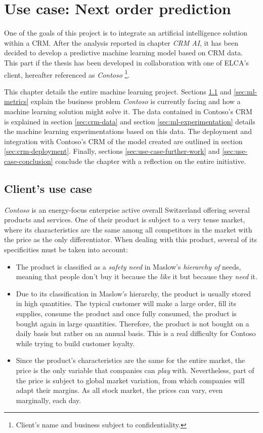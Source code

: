\chapter{Use case: Next order prediction} \label{chapter:use-case}

One of the goals of this project is to integrate an artificial intelligence solution within a CRM. After the analysis reported in chapter \textit{CRM AI}, it has been decided to develop a predictive machine learning model based on CRM data. This part if the thesis has been developed in collaboration with one of ELCA's client, hereafter referenced as \textit{Contoso} \footnote{Client's name and business subject to confidentiality.}.

This chapter details the entire machine learning project. Sections \ref{sec:use-case} and \ref{sec:ml-metrics} explain the business problem \textit{Contoso} is currently facing and how a machine learning solution might solve it. The data contained in Contoso's CRM is explained in section \ref{sec:crm-data} and section \ref{sec:ml-experimentation} details the machine learning experimentations based on this data. The deployment and integration with Contoso's CRM of the model created are outlined in section \ref{sec:crm-deployment}. Finally, sections \ref{sec:use-case-further-work} and \ref{sec:use-case-conclusion} conclude the chapter with a reflection on the entire initiative.

\section{Client's use case} \label{sec:use-case}
\textit{Contoso} is an energy-focus enterprise active overall Switzerland offering several products and services. One of their product is subject to a very tense market, where its characteristics are the same among all competitors in the market with the price as the only differentiator. When dealing with this product, several of its specificities must be taken into account:
\begin{itemize}
\item The product is classified as a \textit{safety need} in Maslow's \textit{hierarchy of }needs\cite{wiki:Maslow's_hierarchy_of_needs}, meaning that people don't buy it because the \textit{like} it but because they \textit{need} it. 
\item Due to its classification in Maslow's hierarchy, the product is usually stored in high quantities. The typical customer will make a large order, fill its supplies, consume the product and once fully consumed, the product is bought again in large quantities. Therefore, the product is not bought on a daily basis but rather on an annual basis. This is a real difficulty for Contoso while trying to build customer loyalty.
\item Since the product's characteristics are the same for the entire market, the price is the only variable that companies can \textit{play} with. Nevertheless, part of the price is subject to global market variation, from which companies will adapt their margins. As all stock market, the prices can vary, even marginally, each day.
\end{itemize}

